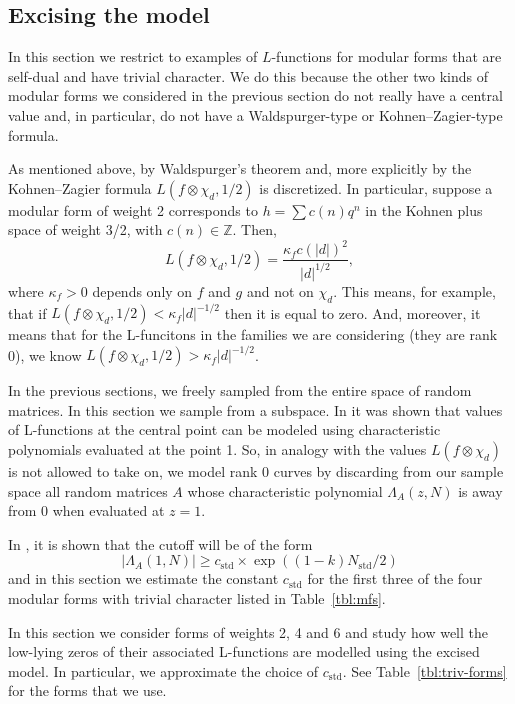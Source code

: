 \documentclass[11pt]{amsart}
\newcommand     {\abs}[1]       {{\left\lvert{#1}\right\rvert}}
\begin{document}
 



\subsection{Excising the model}

In this section we restrict to examples of $L$-functions for modular forms that are self-dual and have trivial character.  We do this because the other two kinds of modular forms we considered in the previous section do not really have a central value and, in particular, do not have a Waldspurger-type or Kohnen--Zagier-type formula.

As mentioned above,  by Waldspurger's theorem \cite{Waldspurger} and, more explicitly by the Kohnen--Zagier formula \cite{KZ} $L(f\otimes \chi_d, 1/2)$ is discretized.  In particular, suppose a modular form of weight 2 corresponds to $h=\sum c(n)q^n$ in the Kohnen plus space of weight 3/2, with $c(n)\in\mathbb{Z}$.  Then,
\[
L(f\otimes\chi_d,1/2) = \frac{\kappa_f c(\abs{d})^2}{\abs{d}^{1/2}},
\]
where $\kappa_f > 0$ depends only on $f$ and $g$ and not on $\chi_d$.  This means, for example, that if  $L(f\otimes\chi_d,1/2) < \kappa_f \abs{d}^{-1/2}$ then it is equal to zero.  And, moreover, it means that for the L-funcitons in the families we are considering (they are rank 0), we know $L(f\otimes\chi_d,1/2) > \kappa_f \abs{d}^{-1/2}$.  

In the previous sections, we freely sampled from the entire space of random matrices.  In this section we sample from a subspace.  In \cite{CF,CKRS,CKRS2,KS} it was shown that values of L-functions at the central point can be modeled using characteristic polynomials evaluated at the point 1.  So, in analogy with the values $L(f\otimes\chi_d)$ is not allowed to take on, we model rank 0 curves by discarding from our sample space all random matrices $A$ whose characteristic polynomial $\Lambda_A(z,N)$ is away from 0 when evaluated at $z=1$.  

In \cite{bm}, it is shown that the cutoff will be of the form
\[
\abs{\Lambda_A(1,N)} \geq c_{\text{std}}\times\exp((1-k)N_{\text{std}}/2)
\]
and in this section we estimate the constant $c_{\text{std}}$ for the first three of the four modular forms with trivial character listed in Table~\ref{tbl:mfs}.

In this section we consider forms of weights 2, 4 and 6 and study how well the low-lying zeros of their associated L-functions are modelled using the excised model.  In particular, we approximate the choice of $c_\text{std}$.  See Table~\ref{tbl:triv-forms} for the forms that we use.
\end{document}
